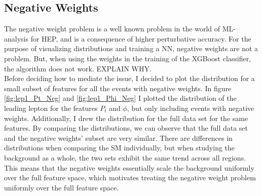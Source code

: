 \subsection{Negative Weights}
The negative weight problem is a well known problem in the world of ML-analysis for HEP, 
and is a consequence of higher perturbative accuracy. For the purpose of visualizing 
distributions and training a \ac{NN}, negative weights are not a problem. But, when using 
the weights in the training of the XGBoost classifier, the algorithm does not work. EXPLAIN
WHY. 
\\
Before deciding how to mediate the issue, I decided to plot the distribution for 
a small subset of features for all the events with negative weights.
In figure \ref{fig:lep1_Pt_Neg} and \ref{fig:lep1_Phi_Neg} I plotted the distribution of the leading 
lepton for the features $P_t$ and $\phi$, but only including events with negative weights.
Additionally, I drew the distribution for the full data set for the same features. By comparing the 
distributions, we can observe that the full data set and the negative weights' subset are very 
similar. There are differences in distributions when comparing the \ac{SM} individually, but when 
studying the background as a whole, the two sets exhibit the same trend across all regions. 
This means that the negative weights essentially scale the background uniformly over the full feature 
space, which motivates treating the negative weight problem uniformly over the full feature space.
